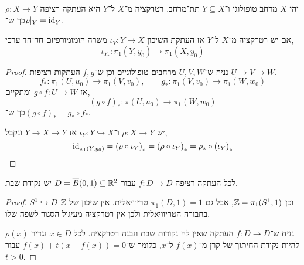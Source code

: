 \begin{definition}[רטרקציה]
	יהי $X$ מרחב טופולוגי ו־$Y \subseteq X$ תת־מרחב.
	\textbf{רטרקציה} מ־$X$ ל־$Y$ היא העתקה רציפה $\rho : X \to Y$ כך ש־$\rho |_Y = \operatorname{id}_Y$.
\end{definition}
\begin{proposition}
	אם יש רטרקציה מ־$X$ ל־$Y$ אז העתקת השיכון $\iota_Y : Y \to X$ משרה הומומורפיזם חד־חד ערכי,
	\[
		\iota_{Y_*} : \pi_1(Y, y_0) \to \pi_1(X, y_0)
	\]
\end{proposition}
\begin{proof}
	נניח ש־$U, V, W$ מרחבים טופולוגיים וכן ש־$f, g$ העתקות רציפות $U \to V \to W$.
	\[
		f_* : \pi_1(U, u_0) \to \pi_1(V, v_0),
		\qquad
		g_* : \pi_1(V, v_0) \to \pi_1(W, w_0)
	\]
	אז $g \circ f : U \to W$ ומתקיים,
	\[
		{(g \circ f)}_* : \pi(U, u_0) \to \pi_1(W, w_0)
	\]
	כך ש־${(g \circ f)}_* = g_* \circ f_*$.

	יש $\rho : X \to Y$ ו־$\iota_Y : Y \hookrightarrow X$ אז $Y \to X \to Y$ ונקבל,
	\[
		\operatorname{id}_{\pi_1(Y, y_0)}
		= {(\rho \circ \iota_Y)}_*
		= {(\rho \circ \iota_Y)}_*
		= \rho_* \circ {(\iota_Y)}_*
	\]
\end{proof}
\begin{corollary}
	לכל העתקה רציפה $f : D \to D$ עבור $D = \overline{B}(0, 1) \subseteq \mathbb{R}^2$ יש נקודת שבת.
\end{corollary}
\begin{proof}
	$S^1 \hookrightarrow D$ וכן $\mathbb{Z} = \pi_1(S^1, 1)$, אבל גם $\pi_1(D, 1) = 1$ טריוויאלית.
	אין שיכון של $\mathbb{Z}$ בחבורה הטריוויאלית ולכן אין רטרקציה מעיגול הסגור לשפה שלו.

	נניח ש־$f : D \to D$ העתקה שאין לה נקודות שבת ונבנה רטרקציה.
	לכל $x \in D$ נגדיר $\rho(x)$ להיות נקודת החיתוך של קרן מ־$f(x)$ ל־$x$, כלומר ש־$f(x) + t(x - f(x)) = 0$ עבור $t > 0$.
\end{proof}

